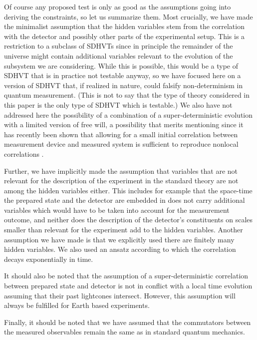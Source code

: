 \documentclass[12pt]{article}                    %
\begin{document}
Of course any proposed test is only as good as the assumptions going into
deriving the constraints, so let us summarize them. Most crucially, 
we have made the minimalist assumption that the hidden
variables stem from the correlation with the detector and possibly other
parts of the experimental setup. This is a restriction to a subclass of
{\sc SDHVT}s since in principle the remainder of the universe might contain additional variables relevant
to the evolution of the subsystem we are considering. While this is possible,
this would be a type of {\sc SDHVT} that is in practice not testable anyway, 
so we have focused here on a version of {\sc SDHVT} that, if realized in nature, 
could falsify non-determinism in quantum measurement. (This is not to say
that the type of theory considered in this paper is the only type of {\sc SDHVT} 
which is testable.) We also have not addressed here the possibility of a
combination of a super-deterministic evolution with a limited version of free will,
a possibility that merits mentioning  since it has recently been shown that 
allowing for a small initial correlation between measurement device and 
measured system is sufficient to reproduce nonlocal correlations \cite{partial}.


Further, we have implicitly made the assumption that variables that are not
relevant for the description of the experiment in the standard theory
are not among the hidden variables either. This includes for example that
the space-time the prepared state and the detector are embedded in does 
not carry additional variables which would have to be taken into account for 
the measurement outcome, and neither does the description of the detector's
constituents on scales smaller than relevant for the experiment add to the
hidden variables. Another assumption we have made is that we explicitly
used there are finitely many hidden variables. We also used an ansatz
according to which the correlation decays exponentially in time. 

It should also be noted that the assumption of a super-deterministic
correlation between prepared state and detector is not in conflict with
a local time evolution assuming that their past lightcones intersect. However, 
this assumption will always be fulfilled for Earth based experiments.

Finally, it should be noted that we have assumed that the commutators
between the measured observables remain the same as in standard quantum
mechanics.
\end{document}
